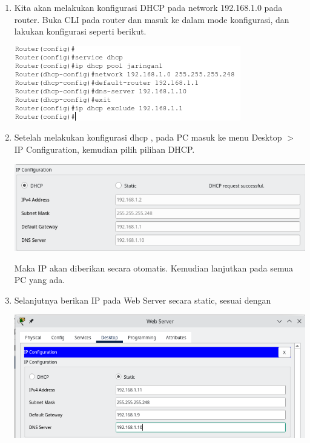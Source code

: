 \documentclass{article}
\begin{document}
\begin{flushleft}
\begin{enumerate}
            \item Kita akan melakukan konfigurasi DHCP pada network 192.168.1.0 pada router. Buka CLI pada router dan masuk ke dalam mode konfigurasi, dan lakukan konfigurasi seperti berikut.

            \begin{center}
                \includegraphics[]{3-3.png}
            \end{center}

            \item Setelah melakukan konfigurasi dhcp , pada PC masuk ke menu Desktop $>$ IP Configuration, kemudian pilih pilihan DHCP.
            
            \begin{center}
                \includegraphics[scale=0.6]{3-4.png}
            \end{center}
            Maka IP akan diberikan secara otomatis. 
            Kemudian lanjutkan pada semua PC yang ada.

            \item Selanjutnya berikan IP pada Web Server secara static, sesuai dengan 

            \begin{center}
                \includegraphics[scale=0.6]{3-5.png}
            \end{center}


\end{enumerate}
\end{flushleft}
\end{document}
